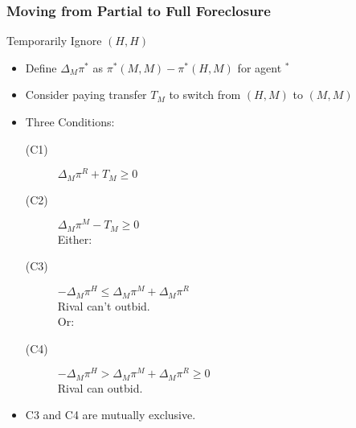 \begin{frame}
\frametitle{Moving from Partial to Full Foreclosure}
Temporarily Ignore $(H,H)$
\begin{itemize}
\item Define $\Delta_M \pi^{*}$ as $\pi^*(M,M) - \pi^*(H,M)$ for agent $ ^*$ 
\item Consider paying transfer $T_M$ to switch from $(H,M)$ to $(M,M)$
\item Three Conditions:
\begin{description}
\item[(C1)] $\Delta_M \pi^R+ T_M \geq 0$
\item[(C2)] $\Delta_M \pi^M - T_M \geq 0$\\
\hspace{-0.8in}Either:
\item[(C3)]  $-\Delta_M \pi^H  \leq \Delta_M \pi^M + \Delta_M \pi^R$ \\
Rival can't outbid.\\
\hspace{-0.8in}Or:
\item[(C4)] $-\Delta_M \pi^H  > \Delta_M \pi^M + \Delta_M \pi^R \geq 0$\\
Rival can outbid.
\end{description}
\item C3 and C4 are mutually exclusive. 
\end{itemize}
\end{frame}



